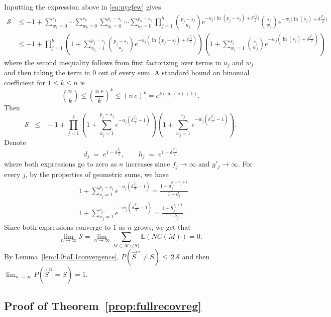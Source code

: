 \documentclass[
  12pt]{article}
\newcommand{\E}{\mathbb{E}}
\newcommand{\M}{\mathcal{M}}
\begin{document}
Inputting the expression above in \eqref{eq:uygfew} gives
\begin{align*}
    \mathcal{S} 
    &\leq -1+\sum_{w_1=0}^{s_1}\cdots\sum_{w_b=0}^{s_b}\sum_{u_1=0}^{p_1-s_1}\cdots\sum_{u_b=0}^{p_b-s_b}\prod_{j=1}^b {\binom{p_j-s_j}{u_j}}e^{- u_j\big(\ln(p_j-s_j)+\delta \tfrac{f_j}{2}\big)}{\binom{s_j}{w_j}}e^{-w_j\big(\ln(s_j)+\delta \tfrac{g'_j}{2}\big)}\\
    &\leq - 1 + \prod_{j=1}^b\left(1+\sum_{u_j=1}^{p_j-s_j}{\binom{p_j-s_j}{u_j}}e^{- u_j(\ln(p_j-s_j)+\delta \tfrac{f_j}{2})}\right)\left(1+
    \sum_{w_j=1}^{s_j}{\binom{s_j}{w_j}}
    e^{-w_j(\ln(s_j)+\delta \tfrac{g'_j}{2})}\right) 
\end{align*}
where the second inequality follows from first factorizing over terms in $u_j$ and $w_j$ and then taking the term in 0 out of every sum. A standard bound on binomial coefficient for $1\leq k\leq n$ is
\begin{equation}\label{eq:upperboudbinom}
    \binom{n}{k} \leq \left(\frac{n\,e}{k}\right)^k \leq \left(n\,e\right)^k = e^{k(\ln(n)+1)}.
\end{equation}
Then
\begin{equation}\label{eq:upperbound_sumprob}
    \mathcal{S} \;\;\leq\;\; - 1+\prod_{j=1}^b\left(1+\sum_{u_j=1}^{p_j-s_j}e^{-u_j\left(\delta \tfrac{f_j}{2}-1\right)}\right)\left(1+
    \sum_{w_j=1}^{s_j}    e^{-w_j\left(\delta \tfrac{g'_j}{2}-1\right)}\right) .
\end{equation}
Denote
$$
d_j\;=\;e^{1-\delta \tfrac{f_j}{2}},\qquad h_j\;=\;e^{1-\delta \tfrac{g'_j}{2}}
$$
where both expressions go to zero as $n$ increases since $f_j\to\infty$ and $g'_j\to\infty$.
For every $j$, by the properties of geometric sums, we have
\begin{align*}
    &1+\sum_{u_j=1}^{p_j-s_j}e^{-u_j\left(\delta \tfrac{f_j}{2}-1\right)}
    =\frac{1-d_j^{p_j-s_j+1}}{1-d_j} \\
    &1+\sum_{w_j=1}^{s_j}    e^{-w_j\left(\delta \tfrac{g'_j}{2}-1\right)} =\frac{1-h_j^{s_j+1}}{1-h_j}.
\end{align*}
Since both expressions converge to $1$ as $n$ grows, we get that $$\lim_{n \to \infty} \mathcal{S}=\lim_{n \to \infty} \sum_{M \in \M\setminus \{S\}}\E\left(NC(M)\right)= 0.$$ By Lemma~\ref{lem:L0toL1convergence}, $P(\hat{S}^{ei}\neq S)\leq \,2\, \mathcal{S}$ and then $\lim_{n \to \infty} P(\hat{S}^{ei}= S)=1$.

 \subsection{Proof of Theorem~\ref{prop:fullrecovreg}}
\end{document}
